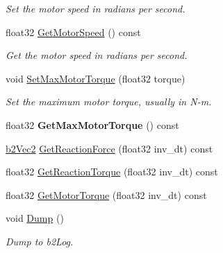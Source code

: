 \begin{DoxyCompactItemize}
\begin{DoxyCompactList}\small\item\em Set the motor speed in radians per second. \end{DoxyCompactList}\item 
float32 \hyperlink{classb2_revolute_joint_a5ebdb2b410725d2c7999d8fce792e0da}{Get\+Motor\+Speed} () const \hypertarget{classb2_revolute_joint_a5ebdb2b410725d2c7999d8fce792e0da}{}\label{classb2_revolute_joint_a5ebdb2b410725d2c7999d8fce792e0da}

\begin{DoxyCompactList}\small\item\em Get the motor speed in radians per second. \end{DoxyCompactList}\item 
void \hyperlink{classb2_revolute_joint_a41779d7ec05be33e6368ef00123a3581}{Set\+Max\+Motor\+Torque} (float32 torque)\hypertarget{classb2_revolute_joint_a41779d7ec05be33e6368ef00123a3581}{}\label{classb2_revolute_joint_a41779d7ec05be33e6368ef00123a3581}

\begin{DoxyCompactList}\small\item\em Set the maximum motor torque, usually in N-\/m. \end{DoxyCompactList}\item 
float32 {\bfseries Get\+Max\+Motor\+Torque} () const \hypertarget{classb2_revolute_joint_a1e990f811430b831967c856adfe452a0}{}\label{classb2_revolute_joint_a1e990f811430b831967c856adfe452a0}

\item 
\hyperlink{structb2_vec2}{b2\+Vec2} \hyperlink{classb2_revolute_joint_a1e5d6eb28f3f35e825cfc42dbd23d66e}{Get\+Reaction\+Force} (float32 inv\+\_\+dt) const 
\item 
float32 \hyperlink{classb2_revolute_joint_a85cdf204bf80dc0a4df6536e2e9a941e}{Get\+Reaction\+Torque} (float32 inv\+\_\+dt) const 
\item 
float32 \hyperlink{classb2_revolute_joint_a64579cb1db5e9674ec17244133c72920}{Get\+Motor\+Torque} (float32 inv\+\_\+dt) const 
\item 
void \hyperlink{classb2_revolute_joint_aa9d88f5476c77a5c4a6ef5b2ad0d3e6f}{Dump} ()\hypertarget{classb2_revolute_joint_aa9d88f5476c77a5c4a6ef5b2ad0d3e6f}{}\label{classb2_revolute_joint_aa9d88f5476c77a5c4a6ef5b2ad0d3e6f}

\begin{DoxyCompactList}\small\item\em Dump to b2\+Log. \end{DoxyCompactList}\end{DoxyCompactItemize}
